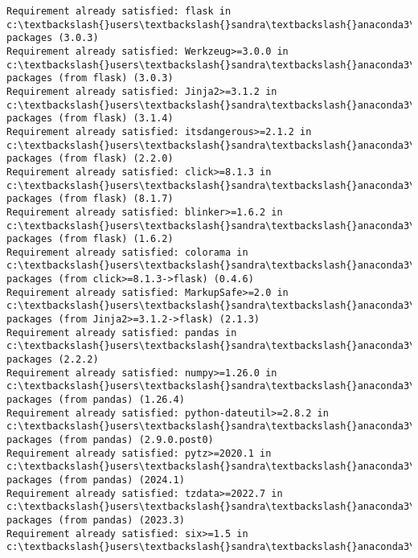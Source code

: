 \documentclass[11pt]{article}
\begin{document}
    \begin{Verbatim}[commandchars=\\\{\}]
Requirement already satisfied: flask in c:\textbackslash{}users\textbackslash{}sandra\textbackslash{}anaconda3\textbackslash{}lib\textbackslash{}site-
packages (3.0.3)
Requirement already satisfied: Werkzeug>=3.0.0 in
c:\textbackslash{}users\textbackslash{}sandra\textbackslash{}anaconda3\textbackslash{}lib\textbackslash{}site-packages (from flask) (3.0.3)
Requirement already satisfied: Jinja2>=3.1.2 in
c:\textbackslash{}users\textbackslash{}sandra\textbackslash{}anaconda3\textbackslash{}lib\textbackslash{}site-packages (from flask) (3.1.4)
Requirement already satisfied: itsdangerous>=2.1.2 in
c:\textbackslash{}users\textbackslash{}sandra\textbackslash{}anaconda3\textbackslash{}lib\textbackslash{}site-packages (from flask) (2.2.0)
Requirement already satisfied: click>=8.1.3 in
c:\textbackslash{}users\textbackslash{}sandra\textbackslash{}anaconda3\textbackslash{}lib\textbackslash{}site-packages (from flask) (8.1.7)
Requirement already satisfied: blinker>=1.6.2 in
c:\textbackslash{}users\textbackslash{}sandra\textbackslash{}anaconda3\textbackslash{}lib\textbackslash{}site-packages (from flask) (1.6.2)
Requirement already satisfied: colorama in c:\textbackslash{}users\textbackslash{}sandra\textbackslash{}anaconda3\textbackslash{}lib\textbackslash{}site-
packages (from click>=8.1.3->flask) (0.4.6)
Requirement already satisfied: MarkupSafe>=2.0 in
c:\textbackslash{}users\textbackslash{}sandra\textbackslash{}anaconda3\textbackslash{}lib\textbackslash{}site-packages (from Jinja2>=3.1.2->flask) (2.1.3)
Requirement already satisfied: pandas in c:\textbackslash{}users\textbackslash{}sandra\textbackslash{}anaconda3\textbackslash{}lib\textbackslash{}site-
packages (2.2.2)
Requirement already satisfied: numpy>=1.26.0 in
c:\textbackslash{}users\textbackslash{}sandra\textbackslash{}anaconda3\textbackslash{}lib\textbackslash{}site-packages (from pandas) (1.26.4)
Requirement already satisfied: python-dateutil>=2.8.2 in
c:\textbackslash{}users\textbackslash{}sandra\textbackslash{}anaconda3\textbackslash{}lib\textbackslash{}site-packages (from pandas) (2.9.0.post0)
Requirement already satisfied: pytz>=2020.1 in
c:\textbackslash{}users\textbackslash{}sandra\textbackslash{}anaconda3\textbackslash{}lib\textbackslash{}site-packages (from pandas) (2024.1)
Requirement already satisfied: tzdata>=2022.7 in
c:\textbackslash{}users\textbackslash{}sandra\textbackslash{}anaconda3\textbackslash{}lib\textbackslash{}site-packages (from pandas) (2023.3)
Requirement already satisfied: six>=1.5 in c:\textbackslash{}users\textbackslash{}sandra\textbackslash{}anaconda3\textbackslash{}lib\textbackslash{}site-

\end{Verbatim}
\end{document}
